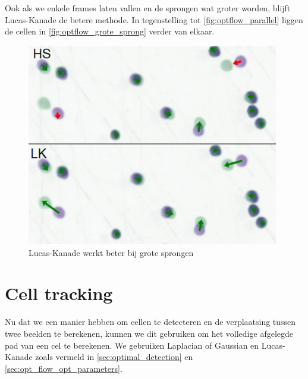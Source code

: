 \documentclass{article}
\begin{document}
\begin{multicols}{2}
Ook als we enkele frames laten vallen en de sprongen wat groter worden, blijft Lucas-Kanade de betere methode. In tegenstelling tot \autoref{fig:optflow_parallel} liggen de cellen in \autoref{fig:optflow_grote_sprong} verder van elkaar.
\begin{figure}[H]
\centering
\includegraphics[width=0.98\textwidth]{images/optflow_grotesprong.png}
\caption{\label{fig:optflow_grote_sprong}Lucas-Kanade werkt beter bij grote sprongen}
\end{figure}

\section{Cell tracking}
\label{sec:cell_tracking}
Nu dat we een manier hebben om cellen te detecteren en de verplaatsing tussen twee beelden te berekenen, kunnen we dit gebruiken om het volledige afgelegde pad van een cel te berekenen. We gebruiken Laplacian of Gaussian en Lucas-Kanade zoals vermeld in \autoref{sec:optimal_detection} en \autoref{sec:opt_flow_opt_parameters}.

\end{multicols}
\end{document}
